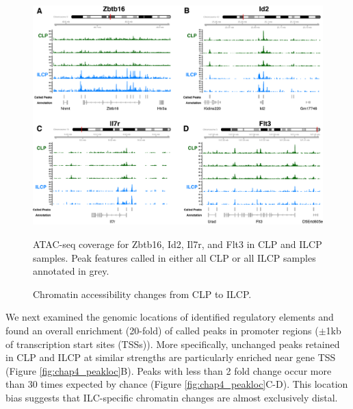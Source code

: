 \begin{figure}[h]
\begin{center}
	\includegraphics[width=\textwidth]{figures/chapter4/Figure_2_atac_peak_examples}
\end{center}
	\caption{Chromatin accessibility changes from CLP to ILCP.} 
	 ATAC-seq coverage for Zbtb16, Id2, Il7r, and Flt3 in CLP and ILCP samples. Peak features called in either all CLP or all ILCP samples annotated in grey. 
	\label{fig:chap4_peakex}
\end{figure}

We next examined the genomic locations of identified regulatory elements and found an overall enrichment (20-fold) of called peaks in promoter regions ($\pm$1kb of transcription start sites (TSSs)). More specifically, unchanged peaks retained in CLP and ILCP at similar strengths are particularly enriched near gene TSS (Figure \ref{fig:chap4_peakloc}B). Peaks with less than 2 fold change occur more than 30 times expected by chance (Figure \ref{fig:chap4_peakloc}C-D). This location bias suggests that ILC-specific chromatin changes are almost exclusively distal. 

